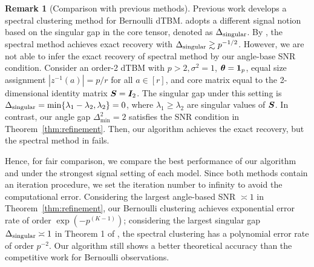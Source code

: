 \documentclass[journal]{IEEEtran}
\theoremstyle{definition}
\theoremstyle{definition}
\newtheorem{rmk}{Remark}
\begin{document}
\begin{itemize}[wide]
\begin{rmk}[Comparison with previous methods]  Previous work \citep{ke2019community} develops a spectral clustering method for Bernoulli dTBM. \cite{ke2019community} adopts a different signal notion based on the singular gap in the core tensor, denoted as $\Delta_{\rm singular}$. By \cite[Theorem 1]{ke2019community}, the spectral method achieves exact recovery with $\Delta_{\rm singular} \gtrsim p^{-1/2}$. However, we are not able to infer the exact recovery of spectral method by our angle-base SNR condition. Consider an order-2 dTBM with $p > 2, \sigma^2 = 1$, $\boldsymbol{\theta} = \mathbf{1}_p$, equal size assignment $|z^{-1}(a)| = p/r$ for all $ a \in [r]$, and core matrix equal to the 2-dimensional identity matrix $\bm S = \bm I_2$. The singular gap under this setting is $\Delta_{\rm singular} = \min\{ \lambda_1 - \lambda_2, \lambda_2 \} = 0$, where $\lambda_1 \geq \lambda_2$ are singular values of $\bm S$. In contrast, our angle gap $\Delta_{\min}^2 = 2$ satisfies the SNR condition in Theorem~\ref{thm:refinement}. Then, our algorithm achieves the exact recovery, but the spectral method in \cite{ke2019community} fails.

Hence, for fair comparison, we compare the best performance of our algorithm and \cite{ke2019community} under the strongest signal setting of each model. Since both methods contain an iteration procedure, we set the iteration number to infinity to avoid the computational error. Considering the largest angle-based SNR $\asymp 1$ in Theorem~\ref{thm:refinement}, our Bernoulli clustering achieves exponential error rate of order $\exp(-p^{(K-1)})$; considering the largest singular gap $\Delta_{\rm singular} \asymp 1$ in Theorem 1 of \cite{ke2019community}, the spectral clustering has a polynomial error rate of order $p^{-2}$. Our algorithm still shows a better theoretical accuracy than the competitive work for Bernoulli observations. 
\end{rmk}


\end{itemize}
\end{document}
